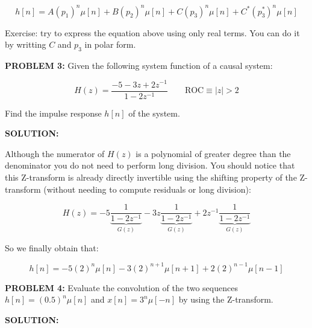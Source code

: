 \documentclass[a4paper,11pt,oneside]{article}
\begin{document}
\begin{equation}\label{impulse}
h[n] = A(p_1)^n\mu[n]+B(p_2)^n\mu[n]+C(p_3)^n\mu[n]+C^*(p_3^*)^n\mu[n]
\end{equation}


Exercise: try to express the equation above using only real terms. You can do it by writting $C$ and $p_3$ in polar form.


\vspace{1cm}


\noindent \textbf{PROBLEM 3:} Given the following system function of a causal system:

\begin{equation}\label{eq:Yz}
H(z)=\frac{-5-3z+2z^{-1}}{1-2z^{-1}} \qquad \textrm{ROC}\equiv |z|>2 
\end{equation}

Find the impulse response $h[n]$ of the system.


\vspace{1cm}

\textbf{SOLUTION:}

Although the numerator of $H(z)$ is a polynomial of greater degree than the denominator you do not need to perform long division. You should notice that this Z-transform is already directly invertible using the shifting property of the Z-transform (without needing to compute residuals or long division):

\[
H(z)=-5\underbrace{\frac{1}{1-2z^{-1}}}_{G(z)}-3z\underbrace{\frac{1}{1-2z^{-1}}}_{G(z)}+2z^{-1}\underbrace{\frac{1}{1-2z^{-1}}}_{G(z)}
\]

So we finally obtain that:

\begin{equation}\label{eq:yn}
h[n] = -5(2)^n\mu[n]-3(2)^{n+1}\mu[n+1]+2(2)^{n-1}\mu[n-1]
\end{equation}




\vspace{1cm}
\textbf{PROBLEM 4:} Evaluate the convolution of the two sequences $h[n]=(0.5)^n\mu[n]$ and $x[n]=3^n\mu[-n]$ by using the Z-transform.


\vspace{1cm}

\textbf{SOLUTION:}
\end{document}
